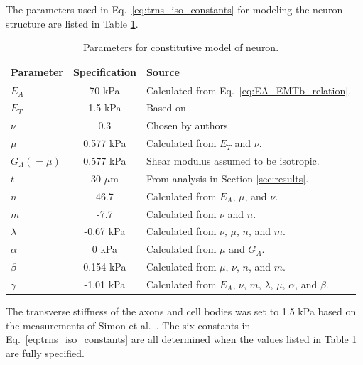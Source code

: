 \documentclass[]{interact}
\begin{document}
The parameters used in Eq.\ \eqref{eq:trns_iso_constants} for modeling the neuron structure are listed in Table \ref{table:neuron_parameters}. 
\begin{table}[ht]
\begin{center}
\begin{tabular}{ l c l }
\hline \hline
Parameter & Specification & Source\\
 \hline
$E_A $ & 70 kPa & Calculated from Eq.\ \eqref{eq:EA_EMTb_relation}. \\ 
$E_T $ & 1.5 kPa & Based on \cite{Simon:2016ig} \\
$\nu $ & 0.3 & Chosen by authors. \\
$\mu $ & 0.577 kPa & Calculated from $E_T$ and $\nu$. \\ 
$G_A (= \mu) $ & 0.577 kPa & Shear modulus assumed to be isotropic.\\ 
$t$ & 30 $\mu$m & From analysis in Section \ref{sec:results}. \\
\hline
$n $ & 46.7 & Calculated from $E_A$, $\mu$, and $\nu$. \\
$m $ & -7.7 & Calculated from $\nu$ and $n$. \\
$\lambda $ &  -0.67 kPa & Calculated from $\nu$, $\mu$, $n$, and $m$. \\
$\alpha $ & 0 kPa & Calculated from $\mu$ and $G_A$. \\
$\beta $ & 0.154 kPa & Calculated from $\mu$, $\nu$, $n$, and $m$. \\
$\gamma $ & -1.01 kPa & Calculated from $E_A$, $\nu$, $m$, $\lambda$, $\mu$, $\alpha$, and $\beta$.\\
\hline \hline
\end{tabular}
\end{center}
\caption{Parameters for constitutive model of neuron.}
\label{table:neuron_parameters}
\end{table}
%
The transverse stiffness of the axons and cell bodies was set to 1.5 kPa based on the measurements of Simon et al.\ \citep{Simon:2016ig}. The six constants in Eq.\ \eqref{eq:trns_iso_constants} are all determined when the values listed in Table \ref{table:neuron_parameters} are fully specified.
\end{document}
